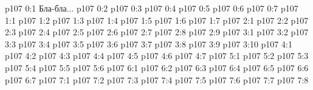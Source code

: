 \author{Одиночный Посланник}
\vs p107 0:1  Бла-бла...
\vs p107 0:2 
\vs p107 0:3 
\vs p107 0:4 
\vs p107 0:5 
\vs p107 0:6 
\vs p107 0:7 \pc 
{}
\vs p107 1:1 
\vs p107 1:2 
\vs p107 1:3 
\vs p107 1:4 
\vs p107 1:5 
\vs p107 1:6 
\vs p107 1:7 \pc 
{}
\vs p107 2:1 
\vs p107 2:2 
\vs p107 2:3 
\vs p107 2:4 
\vs p107 2:5 
\vs p107 2:6 
\vs p107 2:7 
\vs p107 2:8 
\vs p107 2:9 \pc 
{}
\vs p107 3:1 
\vs p107 3:2 
\vs p107 3:3 
\vs p107 3:4 
\vs p107 3:5 
\vs p107 3:6 
\vs p107 3:7 
\vs p107 3:8 
\vs p107 3:9 
\vs p107 3:10 
\vs p107 4:1 
\vs p107 4:2 
\vs p107 4:3 
\vs p107 4:4 \pc 
\vs p107 4:5 
\vs p107 4:6 
\vs p107 4:7 \pc 
{}
\vs p107 5:1 
\vs p107 5:2 
\vs p107 5:3 
\vs p107 5:4 
\vs p107 5:5 
\vs p107 5:6 
\vs p107 6:1 
\vs p107 6:2 
\vs p107 6:3 
\vs p107 6:4 \pc 
\vs p107 6:5 
\vs p107 6:6 
\vs p107 6:7 
\vs p107 7:1 
\vs p107 7:2 
\vs p107 7:3 
\vs p107 7:4 
\vs p107 7:5 
\vs p107 7:6 \pc 
\vs p107 7:7 
\vsetoff
\vs p107 7:8 
\quizlink
